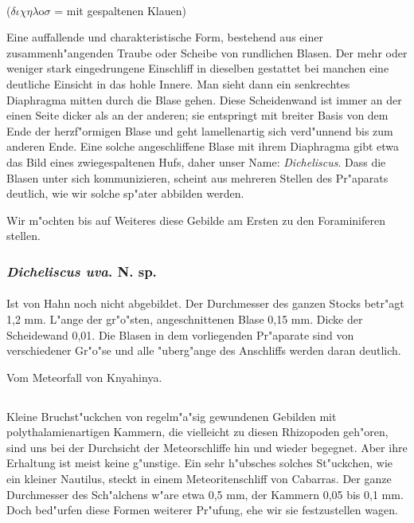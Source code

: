 \documentclass[a4paper, 11pt, oneside]{article}
\begin{document}
\paragraph{}
($\delta\iota\chi\eta\lambda$o$\sigma$ = mit gespaltenen Klauen)%

Eine auffallende und charakteristische Form, bestehend aus einer zusammenh"angenden Traube oder Scheibe von rundlichen Blasen. Der mehr oder weniger stark eingedrungene Einschliff in dieselben gestattet bei manchen eine deutliche Einsicht in das hohle Innere. Man sieht dann ein senkrechtes Diaphragma mitten durch die Blase gehen. Diese Scheidenwand ist immer an der einen Seite dicker als an der anderen; sie entspringt mit breiter Basis von dem Ende der herzf"ormigen Blase und geht lamellenartig sich verd"unnend bis zum anderen Ende. Eine solche angeschliffene Blase mit ihrem Diaphragma gibt etwa das Bild eines zwiegespaltenen Hufs, daher unser Name: \emph{Dicheliscus}. Dass die Blasen unter sich kommunizieren, scheint aus mehreren Stellen des Pr"aparats deutlich, wie wir solche sp"ater abbilden werden.

Wir m"ochten bis auf Weiteres diese Gebilde am Ersten zu den Foraminiferen stellen.
\subsubsection{\emph{Dicheliscus uva}. N. sp.}
\paragraph{}
Ist von Hahn noch nicht abgebildet. Der Durchmesser des ganzen Stocks betr"agt 1,2 mm. L"ange der gr"o"sten, angeschnittenen Blase 0,15 mm. Dicke der Scheidewand 0,01. Die Blasen in dem vorliegenden Pr"aparate sind von verschiedener Gr"o"se und alle "uberg"ange des Anschliffs werden daran deutlich.

Vom Meteorfall von Knyahinya.
\subsection{}
\paragraph{}
Kleine Bruchst"uckchen von regelm"a"sig gewundenen Gebilden mit polythalamienartigen Kammern, die vielleicht zu diesen Rhizopoden geh"oren, sind uns bei der Durchsicht der Meteorschliffe hin und wieder begegnet. Aber ihre Erhaltung ist meist keine g"unstige. Ein sehr h"ubsches solches St"uckchen, wie ein kleiner Nautilus, steckt in einem Meteoritenschliff von Cabarras. Der ganze Durchmesser des Sch"alchens w"are etwa 0,5 mm, der Kammern 0,05 bis 0,1 mm. Doch bed"urfen diese Formen weiterer Pr"ufung, ehe wir sie festzustellen wagen.
\clearpage
\end{document}
